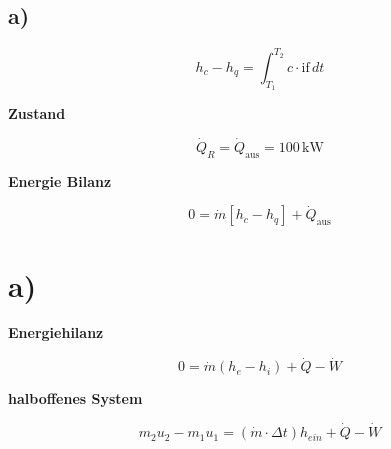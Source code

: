 

\subsection*{a)}

\[
h_c - h_q = \int_{T_1}^{T_2} c \cdot \text{if} \, dt
\]

\textbf{Zustand}

\[
\dot{Q}_R = \dot{Q}_{\text{aus}} = 100 \, \text{kW}
\]

\textbf{Energie Bilanz}

\[
0 = \dot{m} \left[ h_c - h_q \right] + \dot{Q}_{\text{aus}}
\]



\section*{a)}

\textbf{Energiehilanz}

\[
0 = \dot{m} (h_e - h_i) + \dot{Q} - \dot{W}
\]

\textbf{halboffenes System}

\[
m_2 u_2 - m_1 u_1 = (\dot{m} \cdot \Delta t) h_{ein} + \dot{Q} - \dot{W}
\]